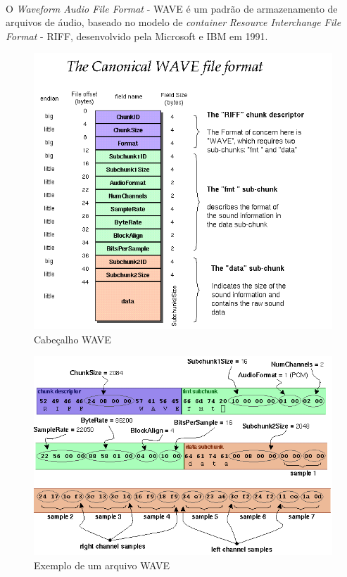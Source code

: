\documentclass[a4paper,12pt]{article}
\begin{document}
\paragraph{}
O \textit{Waveform Audio File Format} - WAVE é um padrão de armazenamento de arquivos de áudio, baseado no modelo de \textit{container} \textit{Resource Interchange File Format} - RIFF, desenvolvido pela Microsoft e IBM em 1991\cite{Microsoft-IBM-1991}.

\begin{figure}[!htb]
	\centering
	\includegraphics[width=\paperwidth/2]{wav-sound-format.png}
	\caption{Cabeçalho WAVE}
	\label{fig:wave-header}
\end{figure}

\begin{figure}[!htb]
	\centering
	\includegraphics[width=\paperwidth/2]{wave-bytes.png}
	\caption{Exemplo de um arquivo WAVE}
	\label{fig:wave-bytes}
\end{figure}
\end{document}
